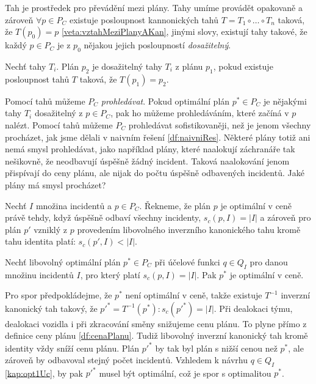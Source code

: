 Tah je prostředek pro převádění mezi plány.
Tahy umíme provádět opakovaně a zároveň $\forall p \in P_C$ existuje posloupnost kannonických tahů $T = T_1 \circ \dots \circ T_n$ taková, že $T(p_0) = p$ \ref{veta:vztahMeziPlanyAKan},
jinými slovy, existují tahy takové, že každý $p \in P_C$ je z $p_0$ nějakou jejich posloupností \textit{dosažitelný}.

\begin{definice}
  Nechť tahy $T_i$.
  Plán $p_2$ je dosažitelný tahy $T_i$ z plánu $p_1$, pokud existuje posloupnost tahů $T$ taková, že $T(p_1) = p_2$.
\end{definice}

Pomocí tahů můžeme $P_C$ \textit{prohledávat}.
Pokud optimální plán $p^* \in P_C$ je nějakými tahy $T_i$ dosažitelný z $p \in P_C$, pak ho můžeme prohledáváním, které začíná v $p$ nalézt.
Pomocí tahů můžeme $P_C$ prohledávat sofistikovaněji, než je jenom všechny procházet, jak jsme dělali v naivním řešení \ref{df:naivniRes}.
Některé plány totiž ani nemá smysl prohledávat, jako například plány, které naalokují záchranáře tak nešikovně, že neodbavují úspěšně žádný incident.
Taková naalokování jenom přispívají do ceny plánu, ale nijak do počtu úspěšně odbavených incidentů.
Jaké plány má smysl procházet?

\begin{definice}\label{veta:planOptVCene}
  Nechť $I$ množina incidentů a $p \in P_C$.
  Řekneme, že plán $p$ je optimální v ceně právě tehdy, když úspěšně odbaví všechny incidenty, $s_c(p, I) = |I|$ a zároveň
  pro plán $p'$ vzniklý z $p$ provedením libovolného inverzního kanonického tahu kromě tahu identita platí: $s_c(p', I) < |I|$.
\end{definice}

\begin{veta}\label{veta:optPlanOptVCene}
  Nechť libovolný optimální plán $p^* \in P_C$ při účelové funkci $q \in Q_I$ pro danou množinu incidentů $I$, pro který platí $s_c(p, I) = |I|$.
  Pak $p^*$ je optimální v ceně.
\end{veta}
\begin{dukaz}
  Pro spor předpokládejme, že $p^*$ není optimální v ceně, takže existuje $T^{-1}$ inverzní kanonický tah takový, že $p'^* = T^{-1}(p^*) \colon s_c(p'^*) = |I|$.
  Při dealokaci týmu, dealokaci vozidla i při zkracování směny snižujeme cenu plánu. To plyne přímo z definice ceny plánu \ref{df:cenaPlanu}.
  Tudiž libovolný inverzní kanonický tah kromě identity vždy sníží cenu plánu. 
  Plán $p'^*$ by tak byl plán s nižší cenou než $p^*$, ale zároveň by odbavoval stejný počet incidentů.
  Vzhledem k návrhu $q \in Q_I$ \ref{kap:opt1Uc}, by pak $p'^*$ musel být optimální, což je spor s optimalitou $p^*$.
\end{dukaz}

